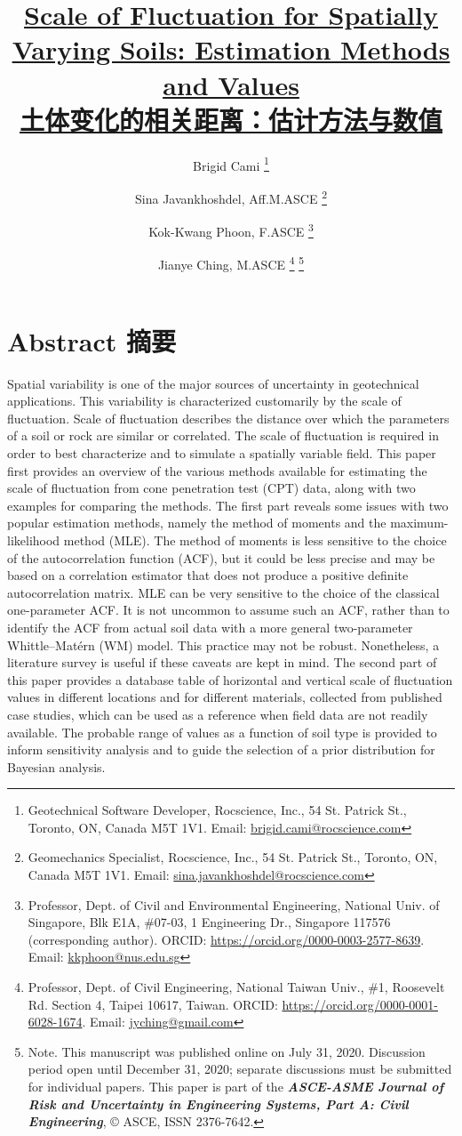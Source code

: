 \documentclass{bilidoc}
\title{\textbf{\href{https://ascelibrary.org/doi/10.1061/AJRUA6.0001083}{Scale of Fluctuation for Spatially Varying Soils: Estimation Methods and Values \\土体变化的相关距离：估计方法与数值}}}
\author{Brigid Cami \thanks{
    Geotechnical Software Developer, Rocscience, Inc., 54 St. Patrick St., Toronto, ON, Canada M5T 1V1. Email: \url{brigid.cami@rocscience.com}
} \and Sina Javankhoshdel, Aff.M.ASCE \thanks{
    Geomechanics Specialist, Rocscience, Inc., 54 St. Patrick St., Toronto, ON, Canada M5T 1V1. Email: \url{sina.javankhoshdel@rocscience.com}
} \and Kok-Kwang Phoon, F.ASCE \thanks{
    Professor, Dept. of Civil and Environmental Engineering, National Univ. of Singapore, Blk E1A, \#07-03, 1 Engineering Dr., Singapore 117576 (corresponding author). ORCID: \url{https://orcid.org/0000-0003-2577-8639}. Email: \url{kkphoon@nus.edu.sg}
} \and Jianye Ching, M.ASCE \thanks{
    Professor, Dept. of Civil Engineering, National Taiwan Univ., \#1, Roosevelt Rd. Section 4, Taipei 10617, Taiwan. ORCID: \url{https://orcid.org/0000-0001-6028-1674}. Email: \url{jyching@gmail.com}
} \thanks{
    Note. This manuscript was published online on July 31, 2020. Discussion period open until December 31, 2020; separate discussions must be submitted for individual papers. This paper is part of the {\bf\itshape ASCE-ASME Journal of Risk and Uncertainty in Engineering Systems, Part A: Civil Engineering}, © ASCE, ISSN 2376-7642.
}}
\date{}
\begin{document}
\maketitle

\vspace{-13mm}

\section*{Abstract 摘要}

\begin{ParaColumn}[][0.62\textwidth]

    Spatial variability is one of the major sources of uncertainty in geotechnical applications. This variability is characterized customarily by the scale of fluctuation. Scale of fluctuation describes the distance over which the parameters of a soil or rock are similar or correlated. The scale of fluctuation is required in order to best characterize and to simulate a spatially variable field. This paper first provides an overview of the various methods available for estimating the scale of fluctuation from cone penetration test (CPT) data, along with two examples for comparing the methods. The first part reveals some issues with two popular estimation methods, namely the method of moments and the maximum-likelihood method (MLE). The method of moments is less sensitive to the choice of the autocorrelation function (ACF), but it could be less precise and may be based on a correlation estimator that does not produce a positive definite autocorrelation matrix. MLE can be very sensitive to the choice of the classical one-parameter ACF. It is not uncommon to assume such an ACF, rather than to identify the ACF from actual soil data with a more general two-parameter Whittle–Matérn (WM) model. This practice may not be robust. Nonetheless, a literature survey is useful if these caveats are kept in mind. The second part of this paper provides a database table of horizontal and vertical scale of fluctuation values in different locations and for different materials, collected from published case studies, which can be used as a reference when field data are not readily available. The probable range of values as a function of soil type is provided to inform sensitivity analysis and to guide the selection of a prior distribution for Bayesian analysis.
    
    \switchcolumn


\end{ParaColumn}
\end{document}
